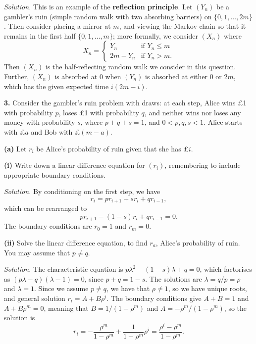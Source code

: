 \documentclass[
  a4paper,
]{article}
\theoremstyle{definition}
\theoremstyle{definition}
\theoremstyle{definition}
\theoremstyle{remark}
\begin{document}
\begin{myanswers}

\emph{Solution.} This is an example of the \textbf{reflection principle}. Let \((Y_n)\) be a gambler's ruin (simple random walk with two absorbing barriers) on \(\{0,1,\dots, 2m\}\). Then consider placing a mirror at \(m\), and viewing the Markov chain so that it remains in the first half \(\{0,1,\dots,m\}\); more formally, we consider \((X_n)\) where
\[ X_n = \begin{cases} Y_n & \text{if $Y_n \leq m$} \\
                      2m - Y_n & \text{if $Y_n > m$.} \end{cases}   \]
Then \((X_n)\) is the half-reflecting random walk we consider in this question. Further, \((X_n)\) is absorbed at \(0\) when \((Y_n)\) is absorbed at either \(0\) or \(2m\), which has the given expected time \(i(2m-i)\).

\end{myanswers}

\textbf{3.} Consider the gambler's ruin problem with draws: at each step, Alice wins £1 with probability \(p\), loses £1 with probability \(q\), and neither wins nor loses any money with probability \(s\), where \(p + q +s = 1\), and \(0 < p,q,s<1\). Alice starts with £\(a\) and Bob with £\((m-a)\).

\textbf{(a)} Let \(r_i\) be Alice's probability of ruin given that she has £\(i\).

\textbf{(i)} Write down a linear difference equation for \((r_i)\), remembering to include appropriate boundary conditions.

\begin{myanswers}

\emph{Solution.} By conditioning on the first step, we have
\[ r_i = pr_{i+1} + sr_i + qr_{i-1} , \]
which can be rearranged to
\[ pr_{i+1} - (1-s)r_i + qr_{i-1} = 0 . \]
The boundary conditions are \(r_0 = 1\) and \(r_m = 0\).

\end{myanswers}

\textbf{(ii)} Solve the linear difference equation, to find \(r_a\), Alice's probability of ruin. You may assume that \(p \neq q\).

\begin{myanswers}

\emph{Solution.} The characteristic equation is \(p\lambda^2 - (1-s)\lambda + q = 0\), which factorises as \((p\lambda - q)(\lambda - 1) = 0\), since \(p + q = 1-s\). The solutions are \(\lambda = q/p = \rho\) and \(\lambda = 1\). Since we assume \(p \neq q\), we have that \(\rho \neq 1\), so we have unique roots, and general solution
\(r_i = A + B \rho^i\). The boundary conditions give \(A + B = 1\) and \(A + B\rho^m = 0\), meaning that \(B = 1/(1-\rho^m)\) and \(A = -\rho^m/(1-\rho^m)\), so the solution is
\[ r_i = -\frac{\rho^m}{1-\rho^m} + \frac{1}{1-\rho^m}\rho^i = \frac{\rho^i - \rho^m}{1-\rho^m}.   \]

\end{myanswers}
\end{document}
